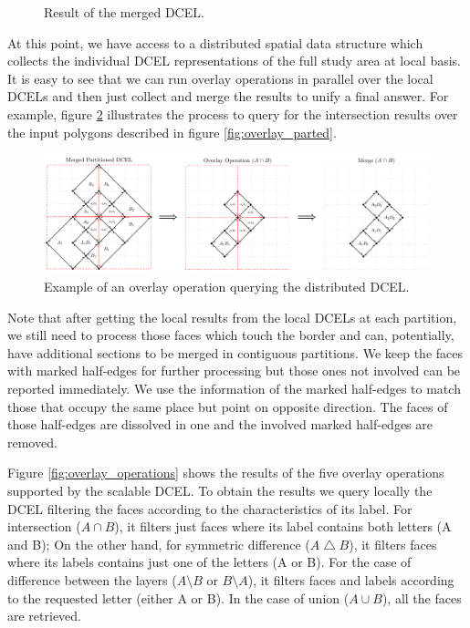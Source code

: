 \begin{figure}[!ht]
    \centering
        
    \caption{Result of the merged DCEL.}\label{fig:merged_dcel}
\end{figure}

At this point, we have access to a distributed spatial data structure which collects the individual DCEL representations of the full study area at local basis.  It is easy to see that we can run overlay operations in parallel over the local DCELs and then just collect and merge the results to unify a final answer.  For example, figure \ref{fig:overlay_parted2} illustrates the process to query for the intersection results over the input polygons described in figure \ref{fig:overlay_parted}.

\begin{figure}[!ht]
    \centering
    \includegraphics[width=\linewidth]{figures/03-OverlayParted2}
    \caption{Example of an overlay operation querying the distributed DCEL.} \label{fig:overlay_parted2}
\end{figure}

Note that after getting the local results from the local DCELs at each partition, we still need to process those faces which touch the border and can, potentially, have additional sections to be merged in contiguous partitions.  We keep the faces with marked half-edges for further processing but those ones not involved can be reported immediately.  We use the information of the marked half-edges to match those that occupy the same place but point on opposite direction.  The faces of those half-edges are dissolved in one and the involved marked half-edges are removed. 

Figure \ref{fig:overlay_operations} shows the results of the five overlay operations supported by the scalable DCEL.  To obtain the results we query locally the DCEL filtering the faces according to the characteristics of its label.  For intersection ($A \cap B$), it filters just faces where its label contains both letters (A and B); On the other hand, for symmetric difference ($A \bigtriangleup B$), it filters faces where its labels contains just one of the letters (A or B).  For the case of difference between the layers ($A \setminus B$ or $B \setminus A$), it filters faces and labels according to the requested letter (either A or B). In the case of union ($A \cup B$), all the faces are retrieved. 


